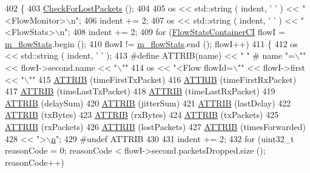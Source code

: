 \begin{DoxyCode}
402 \{
403   \hyperlink{classns3_1_1FlowMonitor_a278237eb8464a95047b23144b90eb264}{CheckForLostPackets} ();
404 
405   os << std::string ( indent, \textcolor{charliteral}{' '} ) << \textcolor{stringliteral}{"<FlowMonitor>\(\backslash\)n"};
406   indent += 2;
407   os << std::string ( indent, \textcolor{charliteral}{' '} ) << \textcolor{stringliteral}{"<FlowStats>\(\backslash\)n"};
408   indent += 2;
409   \textcolor{keywordflow}{for} (\hyperlink{classns3_1_1FlowMonitor_a877e8f8629ab3d39b7c320c8900de46a}{FlowStatsContainerCI} flowI = \hyperlink{classns3_1_1FlowMonitor_a2699e372608a07801e1d1028377d08da}{m\_flowStats}.begin ();
410        flowI != \hyperlink{classns3_1_1FlowMonitor_a2699e372608a07801e1d1028377d08da}{m\_flowStats}.end (); flowI++)
411     \{
412       os << std::string ( indent, \textcolor{charliteral}{' '} );
413 \textcolor{preprocessor}{#define ATTRIB(name) << " " # name "=\(\backslash\)"" << flowI->second.name << "\(\backslash\)""}
414       os << \textcolor{stringliteral}{"<Flow flowId=\(\backslash\)""} << flowI->first << \textcolor{stringliteral}{"\(\backslash\)""}
415       \hyperlink{flow-monitor_8cc_a2f49aa9c01217bb2ae9f582c391292cb}{ATTRIB} (timeFirstTxPacket)
416       \hyperlink{flow-monitor_8cc_a2f49aa9c01217bb2ae9f582c391292cb}{ATTRIB} (timeFirstRxPacket)
417       \hyperlink{flow-monitor_8cc_a2f49aa9c01217bb2ae9f582c391292cb}{ATTRIB} (timeLastTxPacket)
418       \hyperlink{flow-monitor_8cc_a2f49aa9c01217bb2ae9f582c391292cb}{ATTRIB} (timeLastRxPacket)
419       \hyperlink{flow-monitor_8cc_a2f49aa9c01217bb2ae9f582c391292cb}{ATTRIB} (delaySum)
420       \hyperlink{flow-monitor_8cc_a2f49aa9c01217bb2ae9f582c391292cb}{ATTRIB} (jitterSum)
421       \hyperlink{flow-monitor_8cc_a2f49aa9c01217bb2ae9f582c391292cb}{ATTRIB} (lastDelay)
422       \hyperlink{flow-monitor_8cc_a2f49aa9c01217bb2ae9f582c391292cb}{ATTRIB} (txBytes)
423       \hyperlink{flow-monitor_8cc_a2f49aa9c01217bb2ae9f582c391292cb}{ATTRIB} (rxBytes)
424       \hyperlink{flow-monitor_8cc_a2f49aa9c01217bb2ae9f582c391292cb}{ATTRIB} (txPackets)
425       \hyperlink{flow-monitor_8cc_a2f49aa9c01217bb2ae9f582c391292cb}{ATTRIB} (rxPackets)
426       \hyperlink{flow-monitor_8cc_a2f49aa9c01217bb2ae9f582c391292cb}{ATTRIB} (lostPackets)
427       \hyperlink{flow-monitor_8cc_a2f49aa9c01217bb2ae9f582c391292cb}{ATTRIB} (timesForwarded)
428       << ">\(\backslash\)\hyperlink{namespacesample-rng-plot_aeb5ee5c431e338ef39b7ac5431242e1d}{n}";
429 \textcolor{preprocessor}{#undef ATTRIB}
430 
431       indent += 2;
432       \textcolor{keywordflow}{for} (uint32\_t reasonCode = 0; reasonCode < flowI->second.packetsDropped.size (); reasonCode++)

\end{DoxyCode}
